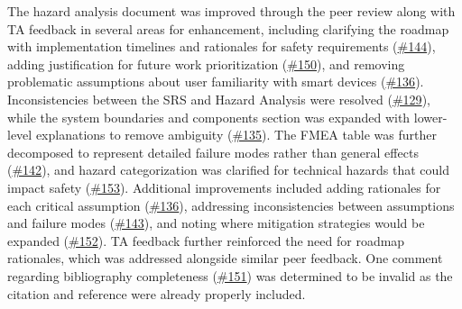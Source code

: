 \documentclass{article}
\begin{document}
The hazard analysis document was improved through the peer review along with TA feedback in several areas for enhancement, including clarifying the roadmap with implementation timelines and rationales for safety requirements (\href{https://github.com/M9Huynh/technically-functional/issues/144}{\#144}), adding justification for future work prioritization (\href{https://github.com/M9Huynh/technically-functional/issues/150}{\#150}), and removing problematic assumptions about user familiarity with smart devices (\href{https://github.com/M9Huynh/technically-functional/issues/136}{\#136}). Inconsistencies between the SRS and Hazard Analysis were resolved (\href{https://github.com/M9Huynh/technically-functional/issues/129}{\#129}), while the system boundaries and components section was expanded with lower-level explanations to remove ambiguity (\href{https://github.com/M9Huynh/technically-functional/issues/135}{\#135}). The FMEA table was further decomposed to represent detailed failure modes rather than general effects (\href{https://github.com/M9Huynh/technically-functional/issues/142}{\#142}), and hazard categorization was clarified for technical hazards that could impact safety (\href{https://github.com/M9Huynh/technically-functional/issues/153}{\#153}). Additional improvements included adding rationales for each critical assumption (\href{https://github.com/M9Huynh/technically-functional/issues/136}{\#136}), addressing inconsistencies between assumptions and failure modes (\href{https://github.com/M9Huynh/technically-functional/issues/143}{\#143}), and noting where mitigation strategies would be expanded (\href{https://github.com/M9Huynh/technically-functional/issues/152}{\#152}). TA feedback further reinforced the need for roadmap rationales, which was addressed alongside similar peer feedback. One comment regarding bibliography completeness (\href{https://github.com/M9Huynh/technically-functional/issues/151}{\#151}) was determined to be invalid as the citation and reference were already properly included.
\end{document}
